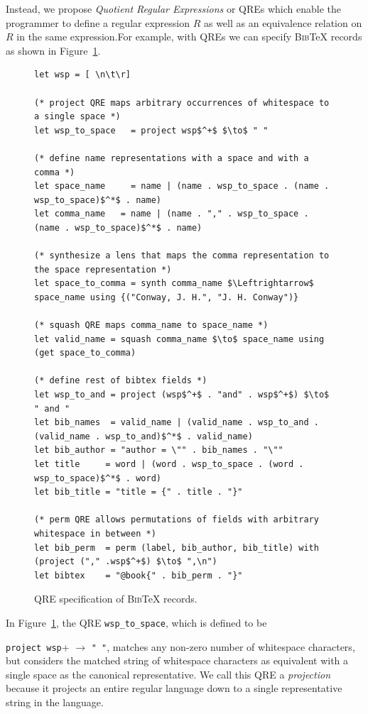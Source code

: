 \documentclass{svproc}
\newcommand{\cd}[1]{\lstinline[backgroundcolor=\color{white}]$#1$}
\newcommand{\bibtex}{\textsc{Bib}\TeX{}}
\begin{document}
Instead, we propose {\em Quotient Regular Expressions} or QREs which enable
the programmer to define a regular expression $R$ as well as an equivalence
relation on $R$ in the same expression.For example, with QREs we can specify
\bibtex{} records as shown in Figure~\ref{fig:example-qre}.

\begin{figure}[t]
\begin{lstlisting}
let wsp = [ \n\t\r]

(* project QRE maps arbitrary occurrences of whitespace to a single space *)
let wsp_to_space   = project wsp$^+$ $\to$ " "

(* define name representations with a space and with a comma *)
let space_name     = name | (name . wsp_to_space . (name . wsp_to_space)$^*$ . name)
let comma_name   = name | (name . "," . wsp_to_space . (name . wsp_to_space)$^*$ . name)

(* synthesize a lens that maps the comma representation to the space representation *)
let space_to_comma = synth comma_name $\Leftrightarrow$ space_name using {("Conway, J. H.", "J. H. Conway")}

(* squash QRE maps comma_name to space_name *)
let valid_name = squash comma_name $\to$ space_name using (get space_to_comma)

(* define rest of bibtex fields *)
let wsp_to_and = project (wsp$^+$ . "and" . wsp$^+$) $\to$ " and " 
let bib_names  = valid_name | (valid_name . wsp_to_and . (valid_name . wsp_to_and)$^*$ . valid_name) 
let bib_author = "author = \"" . bib_names . "\""
let title     = word | (word . wsp_to_space . (word . wsp_to_space)$^*$ . word) 
let bib_title = "title = {" . title . "}" 

(* perm QRE allows permutations of fields with arbitrary whitespace in between *)
let bib_perm  = perm (label, bib_author, bib_title) with (project ("," .wsp$^+$) $\to$ ",\n")
let bibtex    = "@book{" . bib_perm . "}"
\end{lstlisting}
\caption{QRE specification of \bibtex{} records. }
  \label{fig:example-qre}
\end{figure}

In Figure~\ref{fig:example-qre}, the QRE \cd{wsp_to_space}, which is defined to
be 

\noindent \cd{project wsp}+ $\to$ \cd{" "}, matches any non-zero number of
whitespace characters, but considers the matched string of whitespace
characters as equivalent with a single space as the canonical representative. 
We call this QRE a \textit{projection} because it projects an
entire regular language down to a single representative string in the
language.
\end{document}
